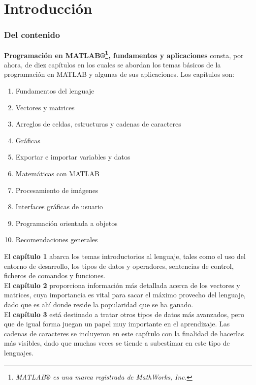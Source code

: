 \chapter*{Introducción}

\subsection*{Del contenido}

\textbf{Programación en MATLAB®\footnote{\emph{MATLAB® es una marca
  registrada de MathWorks, Inc.}}, fundamentos y aplicaciones} consta,
por ahora, de diez capítulos en los cuales se abordan los temas básicos
de la programación en MATLAB y algunas de sus aplicaciones. Los
capítulos son:

\begin{enumerate}
\item
  Fundamentos del lenguaje
\item
  Vectores y matrices
\item
  Arreglos de celdas, estructuras y cadenas de caracteres
\item
  Gráficas
\item
  Exportar e importar variables y datos
\item
  Matemáticas con MATLAB
\item
  Procesamiento de imágenes
\item
  Interfaces gráficas de usuario
\item
  Programación orientada a objetos
\item
  Recomendaciones generales
\end{enumerate}

El \textbf{capítulo 1} abarca los temas introductorios al lenguaje,
tales como el uso del entorno de desarrollo, los tipos de datos y
operadores, sentencias de control, ficheros de comandos y funciones. \\

El \textbf{capítulo 2} proporciona información más detallada acerca de
los vectores y matrices, cuya importancia es vital para sacar el máximo
provecho del lenguaje, dado que es ahí donde reside la popularidad que
se ha ganado. \\

El \textbf{capítulo 3} está destinado a tratar otros tipos de datos más
avanzados, pero que de igual forma juegan un papel muy importante en el
aprendizaje. Las cadenas de caracteres se incluyeron en este capítulo
con la finalidad de hacerlas más visibles, dado que muchas veces se
tiende a subestimar en este tipo de lenguajes. \\

